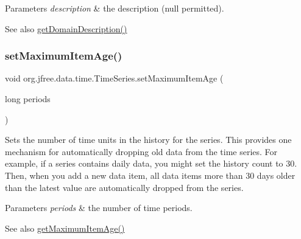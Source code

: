 \begin{DoxyParams}{Parameters}
{\em description} & the description ({\ttfamily null} permitted).\\
\hline
\end{DoxyParams}
\begin{DoxySeeAlso}{See also}
\mbox{\hyperlink{classorg_1_1jfree_1_1data_1_1time_1_1_time_series_a08680700093b691679af7f6fe5eddd0d}{get\+Domain\+Description()}} 
\end{DoxySeeAlso}
\mbox{\label{classorg_1_1jfree_1_1data_1_1time_1_1_time_series_a5bbe512bae71cd45eb54d15a9d4b4a7f}} 
\subsubsection{\texorpdfstring{set\+Maximum\+Item\+Age()}{setMaximumItemAge()}}
{\footnotesize\ttfamily void org.\+jfree.\+data.\+time.\+Time\+Series.\+set\+Maximum\+Item\+Age (\begin{DoxyParamCaption}\item[{long}]{periods }\end{DoxyParamCaption})}

Sets the number of time units in the \textquotesingle{}history\textquotesingle{} for the series. This provides one mechanism for automatically dropping old data from the time series. For example, if a series contains daily data, you might set the history count to 30. Then, when you add a new data item, all data items more than 30 days older than the latest value are automatically dropped from the series.


\begin{DoxyParams}{Parameters}
{\em periods} & the number of time periods.\\
\hline
\end{DoxyParams}
\begin{DoxySeeAlso}{See also}
\mbox{\hyperlink{classorg_1_1jfree_1_1data_1_1time_1_1_time_series_a354525b3ed2463cc3ea0fd998bc91faa}{get\+Maximum\+Item\+Age()}} 
\end{DoxySeeAlso}
\mbox{\label{classorg_1_1jfree_1_1data_1_1time_1_1_time_series_aa263837dfa3b2b03d6bd7c2da6afe940}} 
